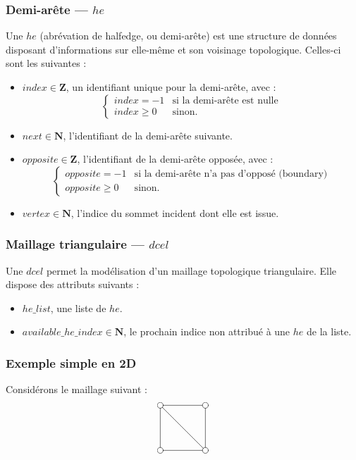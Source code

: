 \documentclass[]{article}
\begin{document}
\subsubsection{Demi-arête — $he$}
Une $he$ (abrévation de halfedge, ou demi-arête) est une structure de données disposant d'informations sur elle-même et son voisinage topologique. Celles-ci sont les suivantes :
\begin{itemize}
	\item $index \in \mathbf{Z}$, un identifiant unique pour la demi-arête, avec :
		\[
			\left\{
				\begin{array}{ll}
					index = -1		& \mbox{si la demi-arête est nulle} \\
					index \geq 0 	& \mbox{sinon.}
				\end{array}
			\right.
		\]
	\item $next \in \mathbf{N}$, l'identifiant de la demi-arête suivante.
	\item $opposite \in \mathbf{Z}$, l'identifiant de la demi-arête opposée, avec :
		\[
			\left\{
				\begin{array}{ll}
					opposite = -1 		& \mbox{si la demi-arête n'a pas d'opposé (boundary)} \\
					opposite \geq 0 	& \mbox{sinon.}
				\end{array}
			\right.
		\]
	\item $vertex \in \mathbf{N}$, l'indice du sommet incident dont elle est issue.
\end{itemize}

\subsubsection{Maillage triangulaire — $dcel$}
Une $dcel$ permet la modélisation d'un maillage topologique triangulaire. Elle dispose des attributs suivants :
\begin{itemize}
	\item $he\_list$, une liste de $he$.
	\item $available\_he\_index \in \mathbf{N}$, le prochain indice non attribué à une $he$ de la liste.
\end{itemize}

\subsubsection{Exemple simple en 2D}
Considérons le maillage suivant :
\[
	\entrymodifiers={+[o][F]}
	\renewcommand{\labelstyle}{\textstyle}
	\xymatrix@=4em @L=.25ex{
		{}
		\ar @^{-} [d]
		\ar @^{-} [dr]
		& {}
		\ar @^{-} [l]
		\\ {}
		\ar @^{-} [r]
		& {}
		\ar @^{-} [u]
	}
\]
\end{document}
